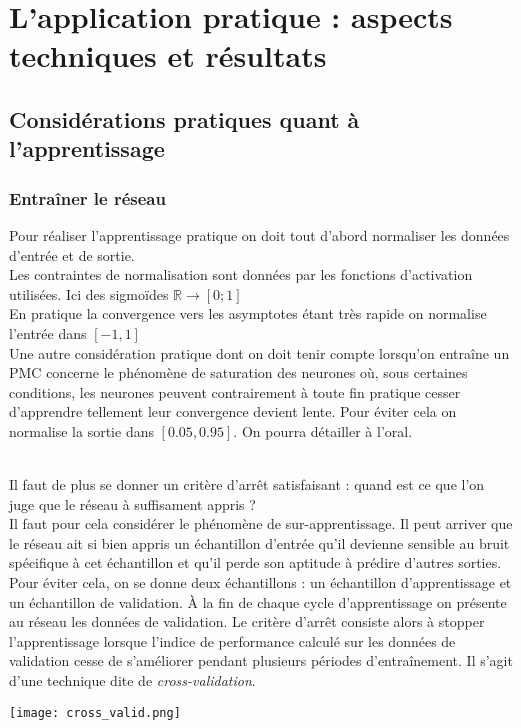 \documentclass[a4paper, 11pt]{article}
\begin{document}
\section{L'application pratique : aspects techniques et résultats}

\subsection{Considérations pratiques quant à l'apprentissage}
	\subsubsection{Entraîner le réseau}
	Pour réaliser l'apprentissage pratique on doit tout d'abord normaliser les données d'entrée et de sortie.
	\\Les contraintes de normalisation sont données par les fonctions d'activation utilisées. Ici des sigmoïdes $\mathbb{R} \to [0;1]$
	\\En pratique la convergence vers les asymptotes étant très rapide on normalise l'entrée dans $[-1,1]$
	\\Une autre considération pratique dont on doit tenir compte lorsqu’on entraîne un PMC concerne le phénomène de saturation des neurones où, sous certaines conditions, les neurones peuvent contrairement à toute fin pratique cesser d’apprendre tellement leur convergence devient lente. Pour éviter cela on normalise la sortie dans $[0.05, 0.95]$. On pourra détailler à l'oral.

	\\Il faut de plus se donner un critère d'arrêt satisfaisant : quand est ce que l'on juge que le réseau à suffisament appris ?
	\\Il faut pour cela considérer le phénomène de sur-apprentissage. Il peut arriver que le réseau ait si bien appris un échantillon d'entrée qu'il devienne sensible au bruit spécifique
	à cet échantillon et qu'il perde son aptitude à prédire d'autres sorties.
	\\Pour éviter cela, on se donne deux échantillons : un échantillon d'apprentissage et un échantillon de validation. À la fin de chaque cycle d'apprentissage on présente au réseau les données de validation. Le critère d’arrêt consiste alors à stopper l’apprentissage lorsque l’indice de performance calculé sur les données de validation cesse de s’améliorer pendant plusieurs périodes d’entraînement. Il s'agit d'une technique dite de \emph{cross-validation}.

	\texttt{[image: cross\_valid.png]}
\end{document}
